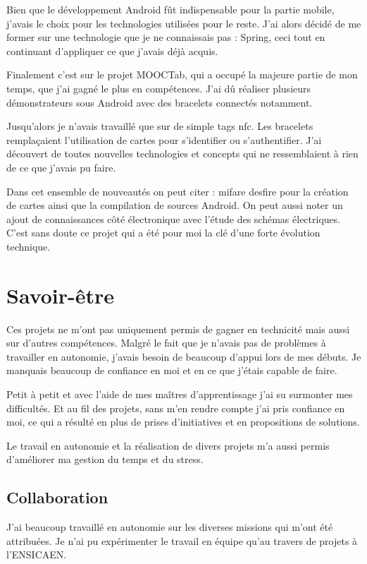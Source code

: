 \documentclass[french,12pt,a4paper,titlepage,openright,openbib]{report}
\begin{document}
Bien que le développement Android fût indispensable pour la partie mobile, j'avais le choix pour les technologies utilisées pour le reste. J'ai alors décidé de me former sur une technologie que je ne connaissais pas : Spring, ceci tout en continuant d'appliquer ce que j'avais déjà acquis.

Finalement c'est sur le projet MOOCTab, qui a occupé la majeure partie de mon temps, que j'ai gagné le plus en compétences. J'ai dû réaliser plusieurs démonstrateurs sous Android avec des bracelets connectés notamment.

Jusqu'alors je n'avais travaillé que sur de simple tags \gls{nfc}. Les bracelets remplaçaient l'utilisation de cartes pour s'identifier ou s'authentifier. J'ai découvert de toutes nouvelles technologies et concepts qui ne ressemblaient à rien de ce que j'avais pu faire.

Dans cet ensemble de nouveautés on peut citer : \gls{mifare} \gls{desfire} pour la création de cartes ainsi que la compilation de sources Android. On peut aussi noter un ajout de connaissances côté électronique avec l'étude des schémas électriques.
C'est sans doute ce projet qui a été pour moi la clé d'une forte évolution technique.
\section{Savoir-être}
Ces projets ne m'ont pas uniquement permis de gagner en technicité mais aussi sur d'autres compétences.
Malgré le fait que je n'avais pas de problèmes à travailler en autonomie, j'avais besoin de beaucoup d'appui lors de mes débuts. Je manquais beaucoup de confiance en moi et en ce que j'étais capable de faire.

Petit à petit et avec l'aide de mes maîtres d'apprentissage j'ai su surmonter mes difficultés.
Et au fil des projets, sans m'en rendre compte j'ai pris confiance en moi, ce qui a résulté en plus de prises d'initiatives et en propositions de solutions.

Le travail en autonomie et la réalisation de divers projets m'a aussi permis d'améliorer ma gestion du temps et du stress.

\subsection{Collaboration}
J'ai beaucoup travaillé en autonomie sur les diverses missions qui m'ont été attribuées. Je n'ai pu expérimenter le travail en équipe qu'au travers de projets à l'ENSICAEN.
\end{document}
